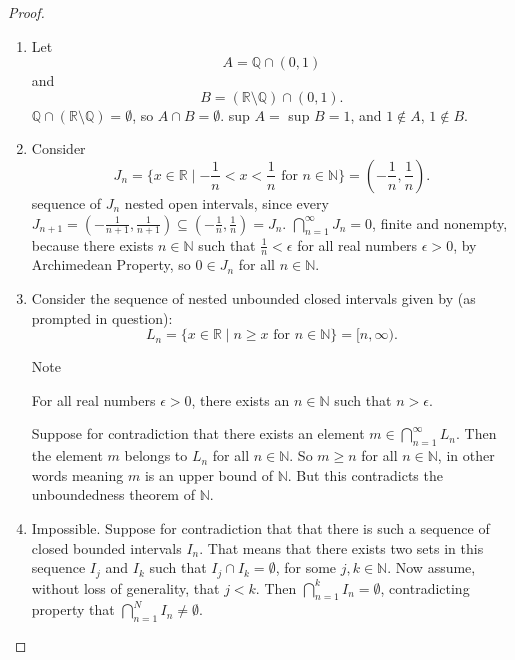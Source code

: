\documentclass[11pt,twoside, reqno, align]{amsart}
\theoremstyle{remark}
\def\R{\mathbb R}
\def\Q{\mathbb Q}
\def\N{\mathbb N}
\begin{document}
\begin{proof}
\begin{enumerate}[label=(\alph*)]
    \item Let
    $$
    A = \Q \cap (0,1)
    $$
    and
    $$
    B = (\R \setminus \Q) \cap (0,1).
    $$
    $\Q \cap (\R \setminus \Q) = \emptyset$, so $A \cap B = \emptyset$. sup $A =$ sup $B = 1$, and $1 \not \in A$, $1 \not \in B$.
    \item Consider
    $$
    J_n = \{x \in \R \mid -\frac{1}{n} < x < \frac{1}{n} \text{ for } n \in \N \} = (-\frac{1}{n}, \frac{1}{n}).
    $$
    sequence of $J_n$ nested open intervals, since every $J_{n+1} = (-\frac{1}{n+1},\frac{1}{n+1}) \subseteq (-\frac{1}{n}, \frac{1}{n}) = J_n$. $\bigcap^\infty_{n = 1} J_n = 0$, finite and nonempty, because there exists $n \in \N$ such that $\frac{1}{n} < \epsilon$ for all real numbers $\epsilon > 0$, by Archimedean Property, so $0 \in J_n$ for all $n \in \N$.
    \item Consider the sequence of nested unbounded closed intervals given by (as prompted in question):
    $$
    L_n = \{x \in \R \mid n \geq x \text{ for } n \in \N \} = [n,\infty).
    $$
    
    Note \newtheorem{Lm}[Unboundedness of $\N$]: For all real numbers $\epsilon > 0$, there exists an $n \in \N$ such that $n > \epsilon$.
    
    Suppose for contradiction that there exists an element $m \in \bigcap^\infty_{n=1}L_n$. Then the element $m$ belongs to $L_n$ for all $n \in \N$. So $m \geq n$ for all $n \in \N$, in other words meaning $m$ is an upper bound of $\N$. But this contradicts the unboundedness theorem of $\N$.
    \item Impossible. Suppose for contradiction that that there is such a sequence of closed bounded intervals $I_n$. That means that there exists two sets in this sequence $I_j$ and $I_k$ such that $I_j \cap I_k = \emptyset$, for some $j,k \in \N$. Now assume, without loss of generality, that $j < k$. Then $\bigcap^k_{n=1}I_n = \emptyset$, contradicting property that $\bigcap^N_{n=1}I_n \neq \emptyset$.
\end{enumerate}
\end{proof}
\end{document}
